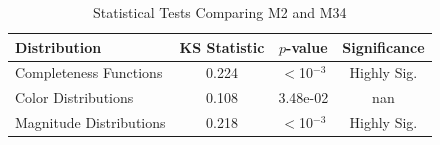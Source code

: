 \begin{table}[ht]
\centering
\caption{Statistical Tests Comparing M2 and M34}
\label{tab:ks_tests}
\begin{tabular}{lccc}
\hline\hline
Distribution & KS Statistic & $p$-value & Significance \\
\hline
Completeness Functions & 0.224 & $<$10$^{-3}$ & Highly Sig. \\
Color Distributions & 0.108 & 3.48e-02 & nan \\
Magnitude Distributions & 0.218 & $<$10$^{-3}$ & Highly Sig. \\
\hline\hline
\end{tabular}
\end{table}
